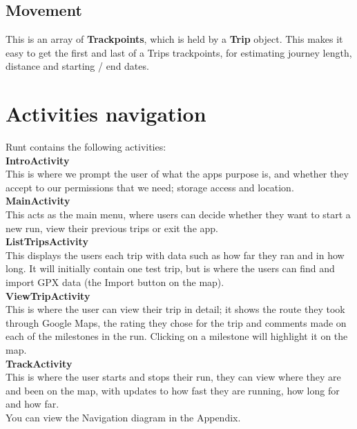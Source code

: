 \documentclass[11pt]{article}
\begin{document}
\subsection{Movement}
This is an array of \textbf{Trackpoints}, which is held by a \textbf{Trip} object. This makes it easy to get the first and last of a Trips trackpoints, for estimating journey length, distance and starting / end dates.


\newpage
\section{Activities navigation}

Runt contains the following activities: \\

\textbf{IntroActivity}\\
This is where we prompt the user of what the apps purpose is, and whether they accept to our permissions that we need; storage access and location. \\

\textbf{MainActivity} \\
This acts as the main menu, where users can decide whether they want to start a new run, view their previous trips or exit the app. \\

\textbf{ListTripsActivity} \\
This displays the users each trip with data such as how far they ran and in how long. It will initially contain one test trip, but is where the users can find and import GPX data (the Import button on the map).\\

\textbf{ViewTripActivity} \\
This is where the user can view their trip in detail; it shows the route they took through Google Maps, the rating they chose for the trip and comments made on each of the milestones in the run. Clicking on a milestone will highlight it on the map. \\

\textbf{TrackActivity} \\
This is where the user starts and stops their run, they can view where they are and been on the map, with updates to how fast they are running, how long for and how far.\\

You can view the Navigation diagram in the Appendix.


\newpage
\end{document}
